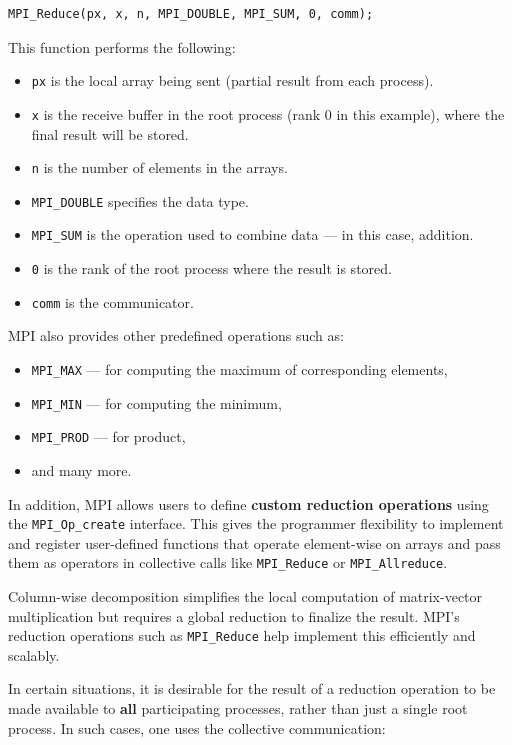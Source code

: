 \documentclass[12pt]{book}
\begin{document}
\begin{lstlisting}[style=cppstyle]
MPI_Reduce(px, x, n, MPI_DOUBLE, MPI_SUM, 0, comm);
\end{lstlisting}

This function performs the following:
\begin{itemize}
    \item \texttt{px} is the local array being sent (partial result from each process).
    \item \texttt{x} is the receive buffer in the root process (rank 0 in this example), where the final result will be stored.
    \item \texttt{n} is the number of elements in the arrays.
    \item \texttt{MPI\_DOUBLE} specifies the data type.
    \item \texttt{MPI\_SUM} is the operation used to combine data — in this case, addition.
    \item \texttt{0} is the rank of the root process where the result is stored.
    \item \texttt{comm} is the communicator.
\end{itemize}

MPI also provides other predefined operations such as:
\begin{itemize}
    \item \texttt{MPI\_MAX} — for computing the maximum of corresponding elements,
    \item \texttt{MPI\_MIN} — for computing the minimum,
    \item \texttt{MPI\_PROD} — for product,
    \item and many more.
\end{itemize}

In addition, MPI allows users to define \textbf{custom reduction operations} using the \texttt{MPI\_Op\_create} interface. This gives the programmer flexibility to implement and register user-defined functions that operate element-wise on arrays and pass them as operators in collective calls like \texttt{MPI\_Reduce} or \texttt{MPI\_Allreduce}.

Column-wise decomposition simplifies the local computation of matrix-vector multiplication but requires a global reduction to finalize the result. MPI’s reduction operations such as \texttt{MPI\_Reduce} help implement this efficiently and scalably.

In certain situations, it is desirable for the result of a reduction operation to be made available to \textbf{all} participating processes, rather than just a single root process. In such cases, one uses the collective communication:
\end{document}
